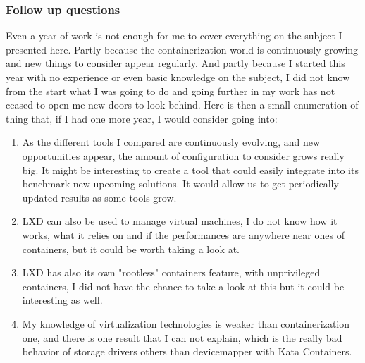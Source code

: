 \subsubsection{Follow up questions}

Even a year of work is not enough for me to cover everything on the subject I presented here.  Partly because the containerization world is continuously growing and new things to consider appear regularly.  And partly because I started this year with no experience or even basic knowledge on the subject, I did not know from the start what I was going to do and going further in my work has not ceased to open me new doors to look behind.  Here is then a small enumeration of thing that, if I had one more year, I would consider going into:
\begin{enumerate}
  \item As the different tools I compared are continuously evolving, and new opportunities appear, the amount of configuration to consider grows really big.  It might be interesting to create a tool that could easily integrate into its benchmark new upcoming solutions.  It would allow us to get periodically updated results as some tools grow.
  \item LXD can also be used to manage virtual machines, I do not know how it works, what it relies on and if the performances are anywhere near ones of containers, but it could be worth taking a look at.
  \item LXD has also its own "rootless" containers feature, with unprivileged containers, I did not have the chance to take a look at this but it could be interesting as well.
  \item My knowledge of virtualization technologies is weaker than containerization one, and there is one result that I can not explain, which is the really bad behavior of storage drivers others than devicemapper with Kata Containers.
\end{enumerate}
